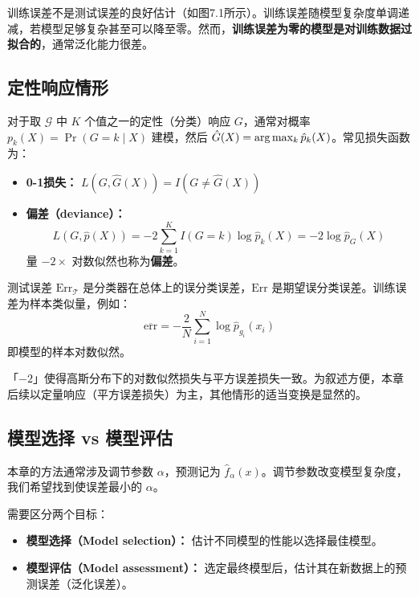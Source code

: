 \begin{remark}
    训练误差不是测试误差的良好估计（如图7.1所示）。训练误差随模型复杂度单调递减，若模型足够复杂甚至可以降至零。然而，\textbf{训练误差为零的模型是对训练数据过拟合的}，通常泛化能力很差。
\end{remark}

\subsection{定性响应情形}

对于取 $\mathcal{G}$ 中 $K$ 个值之一的定性（分类）响应 $G$，通常对概率 $p_k(X) = \Pr(G = k \mid X)$ 建模，然后 $\hat{G}(X) = \arg\max_k \hat{p}_k(X)$。常见损失函数为：

\begin{itemize}
    \item \textbf{0-1损失：} $L(G, \hat{G}(X)) = I(G \neq \hat{G}(X))$
    \item \textbf{偏差（deviance）：}
    \begin{equation}\label{eq:deviance}
        L(G, \hat{p}(X)) = -2\sum_{k=1}^{K} I(G = k)\log \hat{p}_k(X) = -2\log \hat{p}_G(X)
    \end{equation}
    量 $-2 \times$ 对数似然也称为\textbf{偏差}。
\end{itemize}

测试误差 $\mathrm{Err}_{\mathcal{T}}$ 是分类器在总体上的误分类误差，$\mathrm{Err}$ 是期望误分类误差。训练误差为样本类似量，例如：
\begin{equation}
    \overline{\mathrm{err}} = -\frac{2}{N}\sum_{i=1}^{N} \log \hat{p}_{g_i}(x_i)
\end{equation}
即模型的样本对数似然。

\begin{remark}
    「$-2$」使得高斯分布下的对数似然损失与平方误差损失一致。为叙述方便，本章后续以定量响应（平方误差损失）为主，其他情形的适当变换是显然的。
\end{remark}

\subsection{模型选择 vs 模型评估}

本章的方法通常涉及调节参数 $\alpha$，预测记为 $\hat{f}_\alpha(x)$。调节参数改变模型复杂度，我们希望找到使误差最小的 $\alpha$。

需要区分两个目标：

\begin{itemize}
    \item \textbf{模型选择（Model selection）：} 估计不同模型的性能以选择最佳模型。
    \item \textbf{模型评估（Model assessment）：} 选定最终模型后，估计其在新数据上的预测误差（泛化误差）。
\end{itemize}

